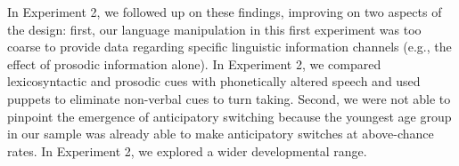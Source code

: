\documentclass[authoryear, 12pt]{elsarticle}
\begin{document}
In Experiment 2, we followed up on these findings, improving on two aspects of the design: first, our language manipulation in this first experiment was too coarse to provide data regarding specific linguistic information channels (e.g., the effect of prosodic information alone). In Experiment 2, we compared lexicosyntactic and prosodic cues with phonetically altered speech and used puppets to eliminate non-verbal cues to turn taking. Second, we were not able to pinpoint the emergence of anticipatory switching because the youngest age group in our sample was already able to make anticipatory switches at above-chance rates. In Experiment 2, we explored a wider developmental range.


\end{document}
